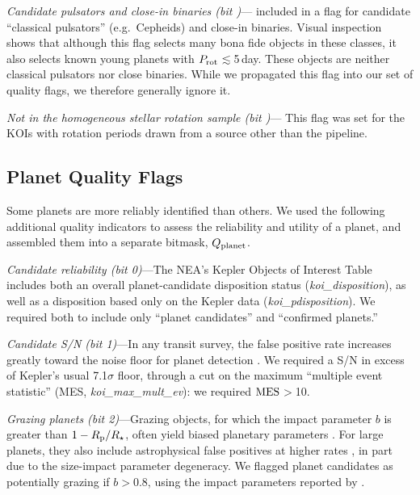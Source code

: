 \documentclass[11pt,twocolumn,tighten]{aastex63}
\begin{document}
{\it Candidate pulsators and close-in binaries (bit
)}---\citeauthor{Santos_2021} included in a flag for candidate
``classical pulsators'' (e.g.\ Cepheids) and close-in binaries.
Visual inspection shows that although this flag selects many bona fide
objects in these classes, it also selects known young planets
with $P_{\rm rot}$$\lesssim$5\,day.  These objects are
neither classical pulsators nor close binaries.  While we propagated
this flag into our set of quality flags, we therefore generally ignore
it.

{\it Not in the homogeneous stellar rotation sample (bit )}--- This
flag was set for the KOIs with rotation periods drawn from a source
other than the \citeauthor{Santos_2019} pipeline.




\subsection{Planet Quality Flags} \label{subsec:plflags} Some planets
are more reliably identified than others.  We used the following
additional quality indicators to assess the reliability and utility of
a planet, and assembled them into a separate bitmask, $Q_{\rm
planet}$.

{\it Candidate reliability (bit 0)}---The NEA's Kepler Objects of
Interest Table includes both an overall planet-candidate disposition
status ({\it koi\_disposition}), as well as a disposition based only
on the Kepler data ({\it koi\_pdisposition}).  We required both to
include only ``planet candidates'' and ``confirmed planets.'' 

{\it Candidate S/N (bit 1)}---In any transit survey, the false
positive rate increases greatly toward the noise floor for planet
detection \citep[e.g.][]{2002ApJ...564..495J}.  We required a S/N in
excess of Kepler's usual 7.1$\sigma$ floor, through a cut on the
maximum ``multiple event statistic'' (MES, {\it koi\_max\_mult\_ev}):
we required ${\rm MES}$$>$10.

{\it Grazing planets (bit 2)}---Grazing objects, for which the impact
parameter $b$ is greater than $1-R_{\rm p}/R_\star$, often yield
biased planetary parameters \citep[e.g.][]{2022AJ....163..111G}.  For
large planets, they also include astrophysical false positives at
higher rates \citep{2016ApJ...822...86M}, in part due to the
size-impact parameter degeneracy.  We flagged planet candidates as
potentially grazing if $b$$>$0.8, using the impact parameters reported
by \citet{Thompson_2018}.
\end{document}
